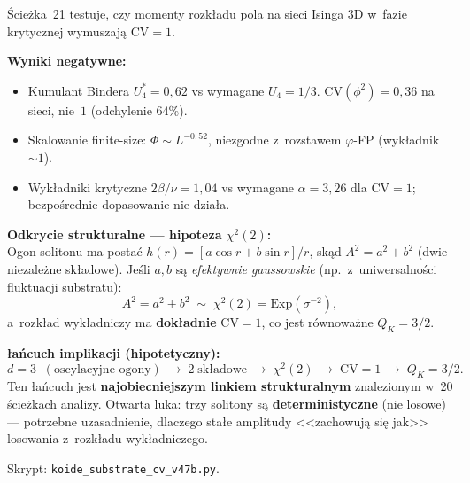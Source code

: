 \begin{remark}%
\label{rem:T-substrate-chi2}
\'Scie\.zka~21 testuje, czy momenty rozk\l{}adu pola na sieci
Isinga 3D w~fazie krytycznej wymuszaj\k{a} $\mathrm{CV} = 1$.

\medskip\noindent
\textbf{Wyniki negatywne:}
\begin{itemize}[nosep]
  \item Kumulant Bindera $U_4^* = 0{,}62$ vs wymagane $U_4 = 1/3$.
    $\mathrm{CV}(\phi^2) = 0{,}36$ na sieci, nie~$1$ (odchylenie $64\%$).
  \item Skalowanie finite-size: $\Phi \sim L^{-0{,}52}$,
    niezgodne z~rozstawem $\varphi$-FP (wyk\l{}adnik $\sim 1$).
  \item Wyk\l{}adniki krytyczne $2\beta/\nu = 1{,}04$
    vs wymagane $\alpha = 3{,}26$ dla $\mathrm{CV} = 1$;
    bezpo\'srednie dopasowanie nie dzia\l{}a.
\end{itemize}

\medskip\noindent
\textbf{Odkrycie strukturalne --- hipoteza $\chi^2(2)$:}\\
Ogon solitonu ma posta\'c $h(r) = [a\cos r + b\sin r]/r$,
sk\k{a}d $A^2 = a^2 + b^2$ (dwie niezale\.zne sk\l{}adowe).
Je\'sli $a, b$ s\k{a} \emph{efektywnie gaussowskie}
(np.\ z~uniwersalno\'sci fluktuacji substratu):
\[
  A^2 = a^2 + b^2 \;\sim\; \chi^2(2) = \mathrm{Exp}(\sigma^{-2}),
\]
a~rozk\l{}ad wyk\l{}adniczy ma \textbf{dok\l{}adnie}
$\mathrm{CV} = 1$, co jest r\'ownowa\.zne $Q_K = 3/2$.

\medskip\noindent
\textbf{\l{}a\'ncuch implikacji (hipotetyczny):}
\[
  d = 3 \;\;(\text{oscylacyjne ogony})
  \;\to\; 2\;\text{sk\l{}adowe}
  \;\to\; \chi^2(2)
  \;\to\; \mathrm{CV} = 1
  \;\to\; Q_K = 3/2.
\]
Ten \l{}a\'ncuch jest \textbf{najobiecniejszym linkiem strukturalnym}
znalezionym w~20 \'scie\.zkach analizy.
Otwarta luka: trzy solitony s\k{a} \textbf{deterministyczne}
(nie losowe) --- potrzebne uzasadnienie,
dlaczego sta\l{}e amplitudy <<zachowuj\k{a} si\k{e} jak>>
losowania z~rozk\l{}adu wyk\l{}adniczego.

Skrypt: \texttt{koide\_substrate\_cv\_v47b.py}.
\end{remark}

